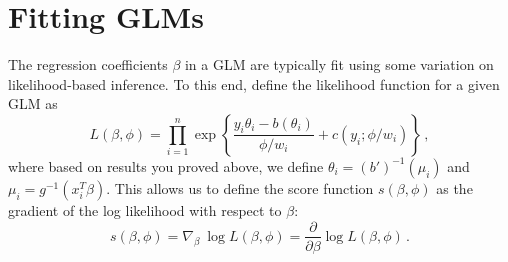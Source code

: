 \documentclass{mynotes}
\begin{document}
\section{Fitting GLMs}

 The regression coefficients $\beta$ in a GLM are typically fit using some variation on likelihood-based inference.  To this end, define the likelihood function for a given GLM as
$$
L(\beta, \phi) = \prod_{i=1}^n \exp \left\{ \frac{y_i \theta_i - b(\theta_i)}{\phi/w_i} + c(y_i; \phi/w_i)   \right \} \, ,
$$
where based on results you proved above, we define $\theta_i = (b')^{-1}(\mu_i)$ and $\mu_i = g^{-1}(x_i^T \beta)$.  This allows us to define the score function $s(\beta, \phi)$ as the gradient of the log likelihood with respect to $\beta$:
$$
s(\beta, \phi) = \nabla_\beta \  \log L(\beta, \phi) = \frac{\partial}{\partial \beta} \log L(\beta, \phi) \, .
$$
\end{document}
